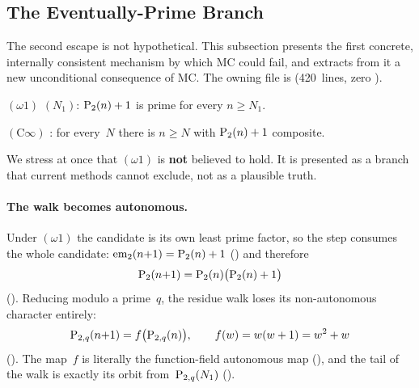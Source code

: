 \subsection{The Eventually-Prime Branch}
\label{sec:autonomous-branch}

The second escape is not hypothetical.  This subsection presents the
first concrete, internally consistent mechanism by which MC could
fail, and extracts from it a new unconditional consequence of MC\@.
The owning file is 
(420~lines, zero ).

\begin{definition}
\label{def:perpetual-primality}
$(\omega 1)$ $(N_1)$:
$\mathrm{P}_{2}(n)+1$ is prime for every $n \geq N_1$.

$(\mathrm{C}\infty)$ : for every~$N$
there is $n \geq N$ with $\mathrm{P}_{2}(n)+1$ composite.
\end{definition}

\noindent
We stress at once that $(\omega 1)$ is \textbf{not} believed to hold.
It is presented as a branch that current methods cannot exclude, not
as a plausible truth.

\paragraph{The walk becomes autonomous.}
Under $(\omega 1)$ the candidate is its own least prime factor, so the
step consumes the whole candidate:
$\mathrm{em}_{2}(n{+}1) = \mathrm{P}_{2}(n)+1$
() and
therefore
\[
  \mathrm{P}_{2}(n{+}1) = \mathrm{P}_{2}(n)\bigl(\mathrm{P}_{2}(n)+1\bigr)
\]
().
Reducing modulo a prime~$q$, the residue walk loses its
non-autonomous character entirely:
\[
  \mathrm{P}_{2,q}(n{+}1) = f\bigl(\mathrm{P}_{2,q}(n)\bigr),
  \qquad f(w) = w(w+1) = w^2 + w
\]
().
The map~$f$ is literally the function-field autonomous map
(),
and the tail of the walk is exactly its orbit from~$\mathrm{P}_{2,q}(N_1)$
().

